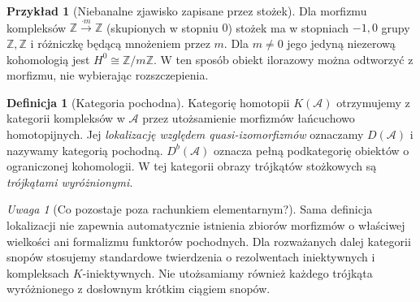 \documentclass[11pt,a4paper,oneside]{report}
\newcommand{\Z}{\mathbb{Z}}
\theoremstyle{plain}
\theoremstyle{definition}
\newtheorem{definicja}[twierdzenie]{Definicja}
\newtheorem{przyklad}[twierdzenie]{Przykład}
\theoremstyle{remark}
\newtheorem{uwaga}[twierdzenie]{Uwaga}
\begin{document}
\begin{przyklad}[Niebanalne zjawisko zapisane przez stożek]
Dla morfizmu kompleksów $\Z\xrightarrow{\cdot m}\Z$
(skupionych w stopniu $0$) stożek ma w stopniach
$-1,0$ grupy $\Z,\Z$ i różniczkę będącą mnożeniem
przez $m$. Dla $m\neq0$ jego jedyną niezerową kohomologią
jest $H^0\cong\Z/m\Z$. W ten sposób obiekt ilorazowy
można odtworzyć z morfizmu, nie wybierając rozszczepienia.
\end{przyklad}

\begin{definicja}[Kategoria pochodna]
Kategorię homotopii $K(\mathcal A)$ otrzymujemy z kategorii
kompleksów w $\mathcal A$ przez utożsamienie morfizmów
łańcuchowo homotopijnych. Jej \emph{lokalizację względem
quasi-izomorfizmów} oznaczamy $D(\mathcal A)$ i nazywamy
kategorią pochodną. $D^b(\mathcal A)$ oznacza pełną
podkategorię obiektów o ograniczonej kohomologii.
W tej kategorii obrazy trójkątów stożkowych są
\emph{trójkątami wyróżnionymi}.
\end{definicja}
\begin{uwaga}[Co pozostaje poza rachunkiem elementarnym?]
Sama definicja lokalizacji nie zapewnia automatycznie
istnienia zbiorów morfizmów o właściwej wielkości ani
formalizmu funktorów pochodnych. Dla rozważanych dalej
kategorii snopów stosujemy standardowe twierdzenia
o rezolwentach iniektywnych i kompleksach $K$-iniektywnych.
Nie utożsamiamy również każdego trójkąta wyróżnionego
z dosłownym krótkim ciągiem snopów.
\end{uwaga}
\end{document}
